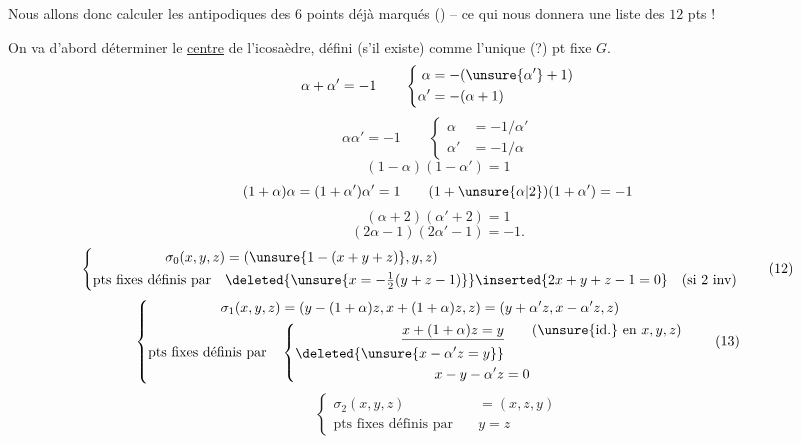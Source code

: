Nous allons donc calculer les antipodiques des $6$ points déjà marqués () -- ce qui nous donnera une liste des $12$ pts !

On va d'abord déterminer le \uline{centre} de l'icosaèdre, défini (s'il existe) comme l'unique (?) pt fixe  $G$.
\[
\alpha+\alpha'=-1\qquad
\left\{\begin{aligned}\alpha&=-(\unsure{\alpha'}+1)\\\alpha'&=-(\alpha+1)\end{aligned}\right.
\]
\[
\alpha\alpha'=-1\qquad
\left\{\begin{aligned}\alpha&=-1/\alpha'\\\alpha'&=-1/\alpha\end{aligned}\right.
\]
\[
(1-\alpha)(1-\alpha')=1
\]
\[
(1+\alpha)\alpha=(1+\alpha')\alpha'=1\qquad(1+\unsure{\alpha|2})(1+\alpha')=-1
\]
\[
(\alpha+2)(\alpha'+2)=1
\]
\[
(2\alpha-1)(2\alpha'-1)=-1.
\]
\[
\left\{\begin{aligned}
\sigma_0(x,y,z)&=(\unsure{1-(x+y+z)},y,z)\\
\text{pts fixes définis par}\quad&\deleted{\unsure{x=-\tfrac12(y+z-1)}}\inserted{2x+y+z-1=0}\quad\text{(si }2\text{ inv)}
\end{aligned}\right.\tag*{(12)}
\]
\[
\left\{\begin{aligned}
\sigma_1(x,y,z)&=(y-(1+\alpha)z,x+(1+\alpha)z,z)=(y+\alpha'z,x-\alpha'z,z)\\
\text{pts fixes définis par}\quad&\left\{\begin{aligned}
\underline{x+(1+\alpha)z=y}&\qquad\text{(\unsure{id.} en }x,y,z\text{)}\\
\deleted{\unsure{x-\alpha'z=y}}&\\
x-y-\alpha'z&=0
\end{aligned}\right.
\end{aligned}\right.\tag*{(13)}
\]
\[
\left\{\begin{aligned}\sigma_2(x,y,z)&=(x,z,y)\\\text{pts fixes définis par}\quad&y=z\end{aligned}\right.\tag*{(14)}
\]

